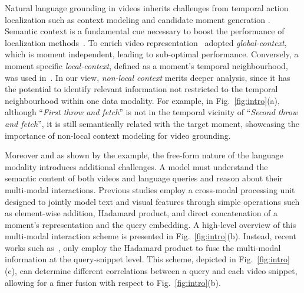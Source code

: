 \documentclass[10pt,twocolumn,letterpaper]{article}
\begin{document}
\indent Natural language grounding in videos inherits challenges from temporal action localization such as context modeling and candidate moment generation \cite{alwassel_2018_detad}. Semantic context is a fundamental cue necessary to boost the performance of localization methods~\cite{Dai_2017_ICCV, Gao_2017_ICCV_TURN,Lin_2018_ECCV, TSN_ECCV_2016, Xu_2020_CVPR}. To enrich video representation~\cite{Hendricks_2017_ICCV} adopted \textit{global-context}, which is moment independent, leading to sub-optimal performance. Conversely, a moment specific \textit{local-context}, defined as a moment's temporal neighbourhood, was used in~\cite{Gao_2017_ICCV, MAC_WACV_2019, jiang2019cross, 10.1145/3240508.3240549, 10.1007/978-3-030-00767-6_32}. In our view, \textit{non-local context} merits deeper analysis, since it has the potential to identify relevant information not restricted to the temporal neighbourhood within one data modality.
For example, in Fig.~\ref{fig:intro}(a), although ``\textit{First throw and fetch}'' is not in the temporal vicinity of ``\textit{Second throw and fetch}'', it is still semantically related with the target moment, showcasing the importance of non-local context modeling for video grounding. 

Moreover and as shown by the example, the free-form nature of the language modality introduces additional challenges. A model must understand the semantic content of both videos and language queries and reason about their multi-modal interactions.
Previous studies \cite{Gao_2017_ICCV, Ge_2019_WACV, 10.1007/978-3-030-00767-6_32} employ a cross-modal processing unit designed to jointly model text and visual features through simple operations such as element-wise addition, Hadamard product, and direct concatenation of a moment's representation and the query embedding.
A high-level overview of this multi-modal interaction scheme is presented in Fig.~\ref{fig:intro}(b).
Instead, recent works such as~\cite{Mun_2020_CVPR}, only employ the Hadamard product to fuse the multi-modal information at the query-snippet level. This scheme, depicted in Fig.~\ref{fig:intro}(c), can determine different correlations between a query and each video snippet, allowing for a finer fusion with respect to Fig.~\ref{fig:intro}(b).
\end{document}
